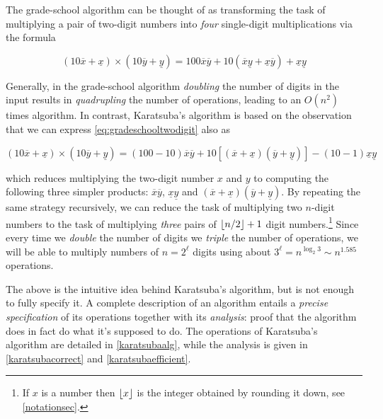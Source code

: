 The grade-school algorithm can be thought of as transforming the task of
multiplying a pair of two-digit numbers into \emph{four} single-digit
multiplications via the formula

\[
(10\overline{x}+\underline{x}) \times (10 \overline{y}+\underline{y}) = 100\overline{x}\overline{y}+10(\overline{x}\underline{y} + \underline{x}\overline{y}) + \underline{x}\underline{y} \label{eq:gradeschooltwodigit}
\]

Generally, in the grade-school algorithm \emph{doubling} the number of
digits in the input results in \emph{quadrupling} the number of
operations, leading to an \(O(n^2)\) times algorithm. In contrast,
Karatsuba's algorithm is based on the observation that we can express
\cref{eq:gradeschooltwodigit} also as

\[
(10\overline{x}+\underline{x}) \times (10 \overline{y}+\underline{y}) = (100-10)\overline{x}\overline{y}+10\left[(\overline{x}+\underline{x})(\overline{y}+\underline{y})\right]  -(10-1)\underline{x}\underline{y} \label{eq:karatsubatwodigit}
\]

which reduces multiplying the two-digit number \(x\) and \(y\) to
computing the following three simpler products:
\(\overline{x}\overline{y}\), \(\underline{x}\underline{y}\) and
\((\overline{x}+\underline{x})(\overline{y}+\underline{y})\). By
repeating the same strategy recursively, we can reduce the task of
multiplying two \(n\)-digit numbers to the task of multiplying
\emph{three} pairs of \(\lfloor n/2 \rfloor+1\) digit numbers.\footnote{If \(x\)
  is a number then \(\lfloor x \rfloor\) is the integer obtained by rounding it
  down, see \cref{notationsec}.} Since every time we \emph{double} the
number of digits we \emph{triple} the number of operations, we will be
able to multiply numbers of \(n=2^\ell\) digits using about
\(3^\ell = n^{\log_2 3} \sim n^{1.585}\) operations.

The above is the intuitive idea behind Karatsuba's algorithm, but is not
enough to fully specify it. A complete description of an algorithm
entails a \emph{precise specification} of its operations together with
its \emph{analysis}: proof that the algorithm does in fact do what it's
supposed to do. The operations of Karatsuba's algorithm are detailed in
\cref{karatsubaalg}, while the analysis is given in
\cref{karatsubacorrect} and \cref{karatsubaefficient}.


